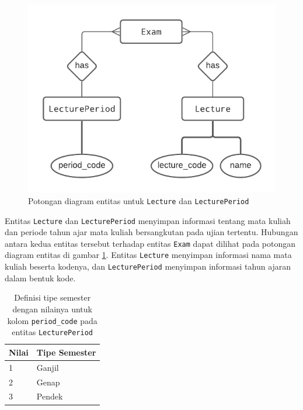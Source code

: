     \begin{figure}
        \centering
        \includegraphics{Gambar/erd-details/ERD--New - Lecture & LecturePeriod.pdf}
        \caption{Potongan diagram entitas untuk \texttt{Lecture} dan \texttt{LecturePeriod}}
        \label{fig:erd_lecture-lectureperiod}
    \end{figure}

    Entitas \texttt{Lecture} dan \texttt{LecturePeriod} menyimpan informasi tentang mata kuliah
    dan periode tahun ajar mata kuliah bersangkutan pada ujian tertentu. Hubungan antara kedua
    entitas tersebut terhadap entitas \texttt{Exam} dapat dilihat pada potongan diagram entitas di 
    gambar \ref{fig:erd_lecture-lectureperiod}.  Entitas \texttt{Lecture} menyimpan informasi nama
    mata kuliah beserta kodenya, dan \texttt{LecturePeriod} menyimpan informasi tahun ajaran
    dalam bentuk kode.
    
    \begin{table}[]
        \centering
        \begin{tabular}{|l|l|}
        \hline
        Nilai & Tipe Semester \\ \hline
        1     & Ganjil        \\ \hline
        2     & Genap         \\ \hline
        3     & Pendek        \\ \hline
        \end{tabular}
        \caption{Definisi tipe semester dengan nilainya untuk kolom
            \texttt{period\_code} pada entitas \texttt{LecturePeriod}}
        \label{tab:lecture-periode}
    \end{table}
    
